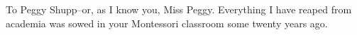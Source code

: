 To Peggy Shupp--or, as I know you, Miss Peggy.
Everything I have reaped from academia was sowed in your Montessori classroom some twenty years ago.
